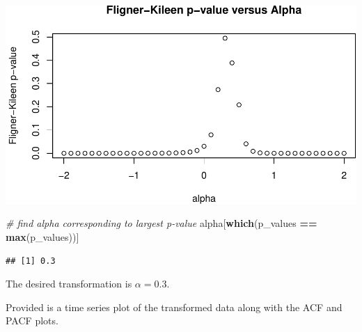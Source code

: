 \documentclass[]{article}
\newenvironment{Shaded}{\begin{snugshade}}{\end{snugshade}}
\newcommand{\CommentTok}[1]{\textcolor[rgb]{0.56,0.35,0.01}{\textit{#1}}}
\newcommand{\KeywordTok}[1]{\textcolor[rgb]{0.13,0.29,0.53}{\textbf{#1}}}
\newcommand{\NormalTok}[1]{#1}
\newcommand{\OperatorTok}[1]{\textcolor[rgb]{0.81,0.36,0.00}{\textbf{#1}}}
\newcommand{\StringTok}[1]{\textcolor[rgb]{0.31,0.60,0.02}{#1}}
\begin{document}
\begin{center}\includegraphics{Q5_files/figure-latex/unnamed-chunk-5-1} \end{center}

\begin{Shaded}
\begin{Highlighting}[]
\CommentTok{# find alpha corresponding to largest p-value}
\NormalTok{alpha[}\KeywordTok{which}\NormalTok{(p_values }\OperatorTok{==}\StringTok{ }\KeywordTok{max}\NormalTok{(p_values))]}
\end{Highlighting}
\end{Shaded}

\begin{verbatim}
## [1] 0.3
\end{verbatim}

The desired transformation is \(\alpha = 0.3\).

Provided is a time series plot of the transformed data along with the
ACF and PACF plots.
\end{document}
